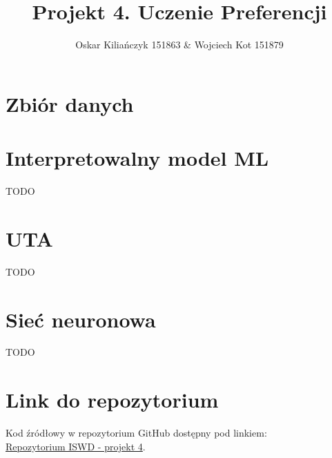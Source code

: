 \documentclass[11pt]{article}
\title{Projekt 4. Uczenie Preferencji}
\author{Oskar Kiliańczyk 151863 \& Wojciech Kot 151879}
\date{}
\begin{document}
\maketitle
\newpage

\section{Zbiór danych}\label{sec:zbior-danych}


\section{Interpretowalny model ML}\label{sec:interpretowalny-model-ml}

TODO

\section{UTA}\label{sec:uta}

TODO

\section{Sieć neuronowa}\label{sec:siec-neuronowa}

TODO





\section{Link do repozytorium}\label{sec:link-do-repo}
Kod źródłowy w repozytorium GitHub dostępny pod linkiem: \\
\href{https://github.com/KotZPolibudy/PUT_ISWD/tree/main/projekt4}{Repozytorium ISWD - projekt 4}.
\end{document}
